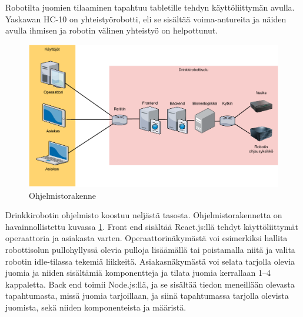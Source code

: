\newpage

Robotilta juomien tilaaminen tapahtuu tabletille tehdyn käyttöliittymän avulla. Yaskawan HC-10 on yhteistyörobotti, eli se sisältää voima-antureita ja näiden avulla ihmisen ja robotin välinen yhteistyö on helpottunut. \cite{Pullonkaula2020}

\begin{figure}[h]
\begin{center}
\includegraphics[scale=0.6]{img/rakenne.pdf}
\end{center}
\caption{Ohjelmistorakenne \cite[s. 11]{Kemppi2021}}
\label{fig:rakenne}
\end{figure}

Drinkkirobotin ohjelmisto koostuu neljästä tasosta. Ohjelmistorakennetta on havainnollistettu kuvassa \ref{fig:rakenne}. Front end sisältää React.js:llä tehdyt käyttöliittymät operaattoria ja asiakasta varten. Operaattorinäkymästä voi esimerkiksi hallita robottisolun pullohyllyssä olevia pulloja lisäämällä tai poistamalla niitä ja valita robotin idle\hyp{}tilassa tekemiä liikkeitä. Asiakasnäkymästä voi selata tarjolla olevia juomia ja niiden sisältämiä komponentteja ja tilata juomia kerrallaan 1--4 kappaletta. Back end toimii Node.js:llä, ja se sisältää tiedon meneillään olevasta tapahtumasta, missä juomia tarjoillaan, ja siinä tapahtumassa tarjolla olevista juomista, sekä niiden komponenteista ja määristä.

